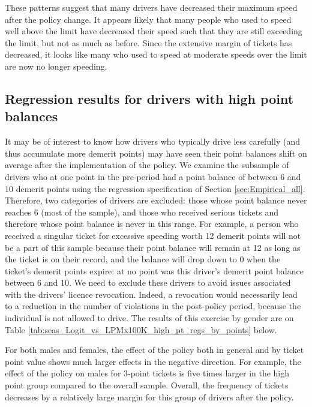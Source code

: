 These patterns suggest that many drivers have decreased their maximum speed 
after the policy change. 
It appears likely that many people who used to speed well above the limit 
have decreased their speed such that they are still exceeding the limit, 
but not as much as before. 
Since the extensive margin of tickets has decreased, 
it looks like many who used to speed at moderate speeds over the limit 
are now no longer speeding.


\subsection{Regression results for drivers with high point balances}
\label{sec:Empirical_high_pts}

It may be of interest to know how drivers who typically drive less carefully 
(and thus accumulate more demerit points) 
may have seen their point balances shift on average after the implementation of the policy. 
We examine the subsample of drivers who at one point in the pre-period 
had a point balance of between 6 and 10 demerit points 
using the regression specification of 
Section \ref{sec:Empirical_all}. 
Therefore, two categories of drivers are excluded: 
those whose point balance never reaches 6 (most of the sample), 
and those who received serious tickets and therefore whose point balance is never in this range. 
For example, a person who received a singular ticket for excessive speeding worth 12 demerit points 
will not be a part of this sample because their point balance will remain at 12 
as long as the ticket is on their record, 
and the balance will drop down to 0 when the ticket’s demerit points expire: 
at no point was this driver’s demerit point balance between 6 and 10. 
We need to exclude these drivers to avoid issues associated with the drivers’ licence revocation. 
Indeed, a revocation would necessarily lead to a reduction in the number of violations 
in the post-policy period, because the individual is not allowed to drive. 
The results of this exercise by gender are on 
Table \ref{tab:seas_Logit_vs_LPMx100K_high_pt_regs_by_points} below. %





For both males and females, 
the effect of the policy both in general and by ticket point value 
shows much larger effects in the negative direction. 
For example, the effect of the policy on males for 3-point tickets is five times larger 
in the high point group compared to the overall sample. 
Overall, the frequency of tickets decreases by a relatively large margin 
for this group of drivers after the policy.




